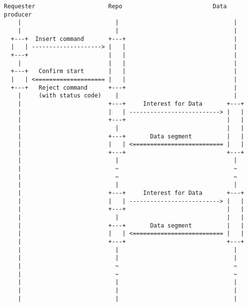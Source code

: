 \documentclass{acm_proc_article-sp}
\begin{document}
\begin{figure*}
\centering
\begin{BVerbatim}
Requester                     Repo                          Data producer
    |                           |                                 |
    |                           |                                 |
  +---+  Insert command       +---+                               |
  |   | --------------------> |   |                               |
  +---+                       |   |                               |
    |                         |   |                               |
  +---+   Confirm start       |   |                               |
  |   | <==================== |   |                               |
  +---+   Reject command      +---+                               |
    |     (with status code)    |                                 |
    |                         +---+     Interest for Data       +---+
    |                         |   | --------------------------> |   |
    |                         +---+                             |   |
    |                           |                               |   |
    |                         +---+       Data segment          |   |
    |                         |   | <========================== |   |
    |                         +---+                             +---+
    |                           |                                 |
    |                           ~                                 ~
    |                           ~                                 ~
    |                           |                                 |
    |                         +---+     Interest for Data       +---+
    |                         |   | --------------------------> |   |
    |                         +---+                             |   |
    |                           |                               |   |
    |                         +---+       Data segment          |   |
    |                         |   | <========================== |   |
    |                         +---+                             +---+
    |                           |                                 |
    |                           |                                 |
    |                           ~                                 ~
    |                           ~                                 ~
    |                           |                                 |
    |                           |                                 |
    |                           |                                 |

\end{BVerbatim}
\end{figure*}
\end{document}
